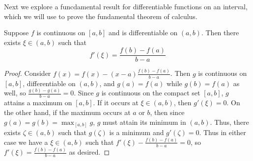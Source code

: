 \begin{subappendices}
    Next we explore a funcdamental result for differentiable functions on an interval, which we will use to prove the fundamental theorem of calculus.

    \begin{namthm}
        Suppose $f$ is continuous on $[a,b]$ and is differentiable on $(a,b)$. Then there exists $\xi \in (a,b)$ such that $$f'(\xi) = \frac{f(b) - f(a)}{b-a}$$
    \end{namthm}
    \begin{proof}
        Consider $f(x) = f(x) - (x-a)\frac{f(b) - f(a)}{b-a}$. Then $g$ is continuous on $[a,b]$, differentiable on $(a,b)$, and $g(a) = f(a)$ while $g(b) = f(a)$ as well, so $\frac{g(b) - g(a)}{b-a} = 0$. Since $g$ is continuous on the compact set $[a,b]$, $g$ attains a maximum on $[a,b]$. If it occurs at $\xi \in (a,b)$, then $g'(\xi) = 0$. On the other hand, if the maximum occurs at $a$ or $b$, then since $g(a) = g(b) = \max_{[a,b]}g$, $g$ must attain its minimum in $(a,b)$. Thus, there exists $\zeta \in (a,b)$ such that $g(\zeta)$ is a minimum and $g'(\zeta) = 0$. Thus in either case we have a $\xi \in (a,b)$ such that $f'(\xi) - \frac{f(b)-f(a)}{b-a} = 0$, so $f'(\xi) = \frac{f(b) - f(a)}{b-a}$ as desired.
    \end{proof}



\end{subappendices}
